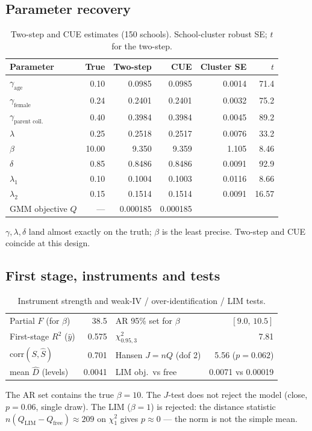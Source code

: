 \documentclass[11pt]{article}
\begin{document}
\subsection{Parameter recovery}
\begin{table}[h]\centering\small
\caption{Two-step and CUE estimates (150 schools). School-cluster robust SE; $t$ for the two-step.}
\begin{tabular}{lrrrrr}
\toprule
Parameter & True & Two-step & CUE & Cluster SE & $t$ \\
\midrule
$\gamma_{\text{age}}$ & 0.10 & 0.0985 & 0.0985 & 0.0014 & 71.4 \\
$\gamma_{\text{female}}$ & 0.24 & 0.2401 & 0.2401 & 0.0032 & 75.2 \\
$\gamma_{\text{parent coll.}}$ & 0.40 & 0.3984 & 0.3984 & 0.0045 & 89.2 \\
$\lambda$ & 0.25 & 0.2518 & 0.2517 & 0.0076 & 33.2 \\
$\beta$ & 10.00 & 9.350 & 9.359 & 1.105 & 8.46 \\
$\delta$ & 0.85 & 0.8486 & 0.8486 & 0.0091 & 92.9 \\
$\lambda_1$ & 0.10 & 0.1004 & 0.1003 & 0.0116 & 8.66 \\
$\lambda_2$ & 0.15 & 0.1514 & 0.1514 & 0.0091 & 16.57 \\
\midrule
GMM objective $Q$ & --- & 0.000185 & 0.000185 & & \\
\bottomrule
\end{tabular}
\end{table}
$\gamma,\lambda,\delta$ land almost exactly on the truth; $\beta$ is the least precise. Two-step and CUE coincide at this design.

\subsection{First stage, instruments and tests}
\begin{table}[h]\centering\small
\caption{Instrument strength and weak-IV / over-identification / LIM tests.}
\begin{tabular}{lr@{\hspace{2.0em}}lr}
\toprule
Partial $F$ (for $\beta$) & 38.5 & AR 95\% set for $\beta$ & $[9.0,\,10.5]$ \\
First-stage $R^2$ ($\widehat y$) & 0.575 & $\chi^2_{0.95,3}$ & 7.81 \\
$\mathrm{corr}(S,\widehat S)$ & 0.701 & Hansen $J=nQ$ (dof 2) & 5.56 ($p=0.062$) \\
mean $\widehat D$ (levels) & 0.0041 & LIM obj.\ vs free & 0.0071 vs 0.00019 \\
\bottomrule
\end{tabular}
\end{table}
The AR set contains the true $\beta=10$. The $J$-test does not reject the model (close, $p=0.06$, single draw). The LIM ($\beta=1$) is rejected: the distance statistic $n(Q_{\text{LIM}}-Q_{\text{free}})\approx 209$ on $\chi^2_1$ gives $p\approx 0$ --- the norm is not the simple mean.
\end{document}
